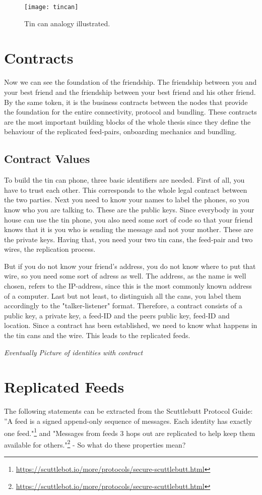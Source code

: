 \begin{figure}
    \centering
    \texttt{[image: tincan]}
    \caption{Tin can analogy illustrated.}
    \label{fig:tincan}
\end{figure}

\section{Contracts}
Now we can see the foundation of the friendship. The friendship between you and your best friend and the friendship between your best friend and his other friend. By the same token, it is the business contracts between the nodes that provide the foundation for the entire connectivity, protocol and bundling. These contracts are the most important building blocks of the whole thesis since they define the behaviour of the replicated feed-pairs, onboarding mechanics and bundling.

\subsection{Contract Values}
To build the tin can phone, three basic identifiers are needed. First of all, you have to trust each other. This corresponds to the whole legal contract between the two parties. Next you need to know your names to label the phones, so you know who you are talking to. These
are the public keys. Since everybody in your house can use the tin phone, you also need some sort of code so that your friend knows that it is you who is sending the message and not your mother. These are the private keys. Having that, you need your two tin cans, the feed-pair and two wires, the replication process.

But if you do not know your friend’s address, you do not know where to put that wire, so you need some sort of adress as well. The address, as the name is well chosen, refers to the IP-address, since this is the most commonly known address of a computer. Last but not least, to distinguish all the cans, you label them accordingly to the "talker-listener" format. Therefore, a contract consists of a public key, a private key, a feed-ID and the peers public key, feed-ID and location. Since a contract has been established, we need to know what happens in the tin cans and the wire. This leads to the replicated feeds. 

\textit{Eventually Picture of identities with contract}

\section{Replicated Feeds}
The following statements can be extracted from the Scuttlebutt Protocol Guide: ”A feed is a signed append-only sequence of messages. Each identity has exactly one feed."\footnote{\url{https://scuttlebot.io/more/protocols/secure-scuttlebutt.html}} and "Messages from feeds 3 hops out are replicated to help keep them available for others."\footnote{\url{https://scuttlebot.io/more/protocols/secure-scuttlebutt.html}} - So what do these properties mean?\\

